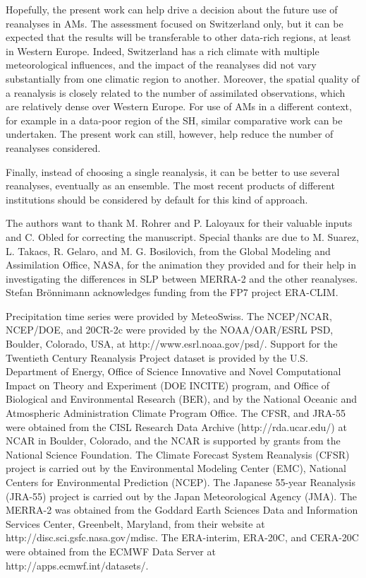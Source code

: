 \documentclass{ametsoc}
\begin{document}
	Hopefully, the present work can help drive a decision about the future use of reanalyses in AMs. The assessment focused on Switzerland only, but it can be expected that the results will be transferable to other data-rich regions, at least in Western Europe. Indeed, Switzerland has a rich climate with multiple meteorological influences, and the impact of the reanalyses did not vary substantially from one climatic region to another. Moreover, the spatial quality of a reanalysis is closely related to the number of assimilated observations, which are relatively dense over Western Europe. For use of AMs in a different context, for example in a data-poor region of the SH, similar comparative work can be undertaken. The present work can still, however, help reduce the number of reanalyses considered.
	
	Finally, instead of choosing a single reanalysis, it can be better to use several reanalyses, eventually as an ensemble. The most recent products of different institutions should be considered by default for this kind of approach.
	
	
	
	
	
	\acknowledgments
	The authors want to thank M. Rohrer and P. Laloyaux for their valuable inputs and C. Obled for correcting the manuscript. Special thanks are due to M. Suarez, L. Takacs, R. Gelaro, and M. G. Bosilovich, from the Global Modeling and Assimilation Office, NASA, for the animation they provided and for their help in investigating the differences in SLP between MERRA-2 and the other reanalyses. Stefan Br\"{o}nnimann acknowledges funding from the FP7 project ERA-CLIM.
	
	Precipitation time series were provided by MeteoSwiss. The NCEP/NCAR, NCEP/DOE, and 20CR-2c were provided by the NOAA/OAR/ESRL PSD, Boulder, Colorado, USA, at http://www.esrl.noaa.gov/psd/. Support for the Twentieth Century Reanalysis Project dataset is provided by the U.S. Department of Energy, Office of Science Innovative and Novel Computational Impact on Theory and Experiment (DOE INCITE) program, and Office of Biological and Environmental Research (BER), and by the National Oceanic and Atmospheric Administration Climate Program Office. The CFSR, and JRA-55 were obtained from the CISL Research Data Archive (http://rda.ucar.edu/) at NCAR in Boulder, Colorado, and the NCAR is supported by grants from the National Science Foundation. The Climate Forecast System Reanalysis (CFSR) project is carried out by the Environmental Modeling Center (EMC), National Centers for Environmental Prediction (NCEP). The Japanese 55-year Reanalysis (JRA-55) project is carried out by the Japan Meteorological Agency (JMA). The MERRA-2 was obtained from the Goddard Earth Sciences Data and Information Services Center, Greenbelt, Maryland, from their website at http://disc.sci.gsfc.nasa.gov/mdisc. The ERA-interim, ERA-20C, and CERA-20C were obtained from the ECMWF Data Server at http://apps.ecmwf.int/datasets/. 
	
\end{document}
